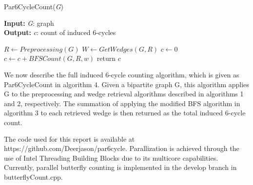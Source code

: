 \documentclass[11pt]{article}
\begin{document}
\begin{algorithm}[H]
\caption{Par6CycleCount(\textit{G})}
\hspace*{\algorithmicindent} \textbf{Input:} \textit{G}: graph \\
\hspace*{\algorithmicindent} \textbf{Output:} \textit{c}: count of induced 6-cycles
\begin{algorithmic}[1]
    \State $R \gets Preprocessing(G)$
    \State $W \gets GetWedges(G, R)$
    \State $c \gets $0
        \State $c \gets c + BFSCount(G, R, w)$
    \EndFor
    \State return $c$
\end{algorithmic}
\end{algorithm}

We now describe the full induced 6-cycle counting algorithm, which is given as Par6CycleCount in algorithm 4.
Given a bipartite graph G, this algorithm applies G to the preprocessing and wedge retrieval algorithms described in algorithms 1 and 2, respectively.
The summation of applying the modified BFS algorithm in algorithm 3 to each retrieved wedge is then returned as the total induced 6-cycle count.

The code used for this report is available at https://github.com/Deerjason/par6cycle.
Parallization is achieved through the use of Intel Threading Building Blocks due to its multicore capabilities.
Currently, parallel butterfly counting is implemented in the develop branch in butterflyCount.cpp.

{}

\end{document}
